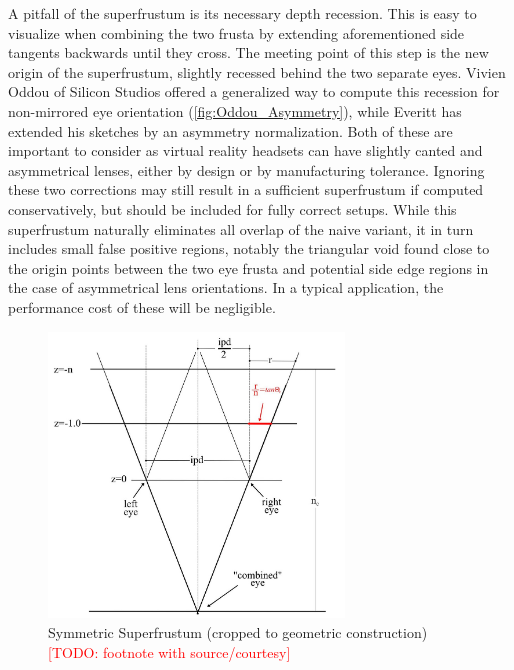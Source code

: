 A pitfall of the superfrustum is its necessary depth recession. This is easy to visualize when combining the two frusta by extending aforementioned side tangents backwards until they cross. The meeting point of this step is the new origin of the superfrustum, slightly recessed behind the two separate eyes. 
Vivien Oddou of Silicon Studios offered a generalized way to compute this recession for non-mirrored eye orientation \cite{Oddou.23.05.2017}(\autoref{fig:Oddou_Asymmetry}), while Everitt has extended his sketches by an asymmetry normalization\cite{Everitt.2015b}. Both of these are important to consider as virtual reality headsets can have slightly canted and asymmetrical lenses, either by design or by manufacturing tolerance. Ignoring these two corrections may still result in a sufficient superfrustum if computed conservatively, but should be included for fully correct setups. 
While this superfrustum naturally eliminates all overlap of the naive variant, it in turn includes small false positive regions, notably the triangular void found close to the origin points between the two eye frusta and potential side edge regions in the case of asymmetrical lens orientations. In a typical application, the performance cost of these will be negligible. \\

\begin{figure}[htb]
  \centering
  \includegraphics[width=0.7\textwidth]{pictures/Everitt_Superfrustum_Crop}
  \caption{Symmetric Superfrustum (cropped to geometric construction)\cite{Everitt.2015} \textcolor{red}{[TODO: footnote with source/courtesy]}} \label{fig:Everitt_Superfrustum}
\end{figure}

